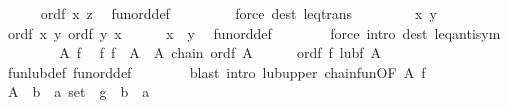 \begin{isabellebody}
\ \ \ \ \isamarkupfalse%
\ {\isachardoublequoteopen}{\isacharquery}{\kern0pt}ordf\ x\ z{\isachardoublequoteclose}\ \isamarkupfalse%
\ fun{\isacharunderscore}{\kern0pt}ord{\isacharunderscore}{\kern0pt}def\ \isanewline
\ \ \ \ \ \ \isamarkupfalse%
\ {\isacharparenleft}{\kern0pt}force\ dest{\isacharcolon}{\kern0pt}\ leq{\isacharunderscore}{\kern0pt}trans{\isacharparenright}{\kern0pt}\isanewline
\ \ \isamarkupfalse%
\isanewline
\ \ \ \ \isamarkupfalse%
\ x\ y\ \isamarkupfalse%
\ {\isachardoublequoteopen}{\isacharquery}{\kern0pt}ordf\ x\ y{\isachardoublequoteclose}\ {\isachardoublequoteopen}{\isacharquery}{\kern0pt}ordf\ y\ x{\isachardoublequoteclose}\isanewline
\ \ \ \ \isamarkupfalse%
\ {\isachardoublequoteopen}x\ {\isacharequal}{\kern0pt}\ y{\isachardoublequoteclose}\ \isamarkupfalse%
\ fun{\isacharunderscore}{\kern0pt}ord{\isacharunderscore}{\kern0pt}def\isanewline
\ \ \ \ \ \ \isamarkupfalse%
\ {\isacharparenleft}{\kern0pt}force\ intro{\isacharbang}{\kern0pt}{\isacharcolon}{\kern0pt}\ dest{\isacharcolon}{\kern0pt}\ leq{\isacharunderscore}{\kern0pt}antisym{\isacharparenright}{\kern0pt}\isanewline
\ \ \isamarkupfalse%
\isanewline
\ \ \ \ \isamarkupfalse%
\ A\ f\ \isamarkupfalse%
\ f{\isacharcolon}{\kern0pt}\ {\isachardoublequoteopen}f\ {\isasymin}\ A{\isachardoublequoteclose}\ \ A{\isacharcolon}{\kern0pt}\ {\isachardoublequoteopen}chain\ {\isacharquery}{\kern0pt}ordf\ A{\isachardoublequoteclose}\isanewline
\ \ \ \ \isamarkupfalse%
\ {\isachardoublequoteopen}{\isacharquery}{\kern0pt}ordf\ f\ {\isacharparenleft}{\kern0pt}{\isacharquery}{\kern0pt}lubf\ A{\isacharparenright}{\kern0pt}{\isachardoublequoteclose}\isanewline
\ \ \ \ \ \ \isamarkupfalse%
\ fun{\isacharunderscore}{\kern0pt}lub{\isacharunderscore}{\kern0pt}def\ fun{\isacharunderscore}{\kern0pt}ord{\isacharunderscore}{\kern0pt}def\isanewline
\ \ \ \ \ \ \isamarkupfalse%
\ {\isacharparenleft}{\kern0pt}blast\ intro{\isacharcolon}{\kern0pt}\ lub{\isacharunderscore}{\kern0pt}upper\ chain{\isacharunderscore}{\kern0pt}fun{\isacharbrackleft}{\kern0pt}OF\ A{\isacharbrackright}{\kern0pt}\ f{\isacharparenright}{\kern0pt}\isanewline
\ \ \isamarkupfalse%
\isanewline
\ \ \ \ \isamarkupfalse%
\ A\ {\isacharcolon}{\kern0pt}{\isacharcolon}{\kern0pt}\ {\isachardoublequoteopen}{\isacharparenleft}{\kern0pt}{\isacharprime}{\kern0pt}b\ {\isasymRightarrow}\ {\isacharprime}{\kern0pt}a{\isacharparenright}{\kern0pt}\ set{\isachardoublequoteclose}\ \ g\ {\isacharcolon}{\kern0pt}{\isacharcolon}{\kern0pt}\ {\isachardoublequoteopen}{\isacharprime}{\kern0pt}b\ {\isasymRightarrow}\ {\isacharprime}{\kern0pt}a{\isachardoublequoteclose}\isanewline

\end{isabellebody}
